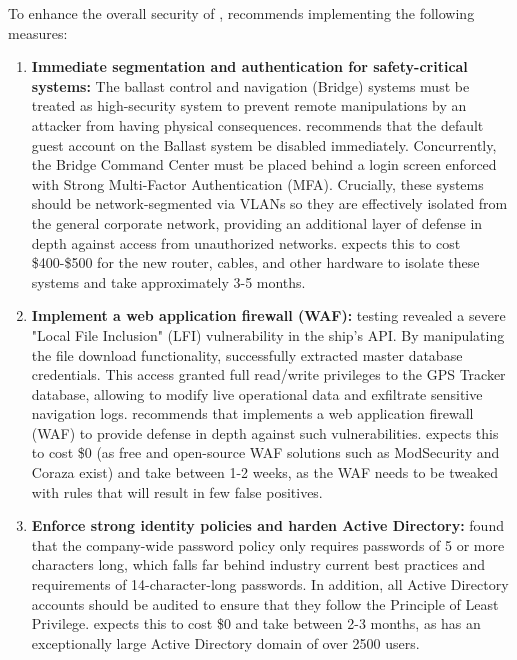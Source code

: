 To enhance the overall security of \clientNoSpace, \team recommends implementing the following measures:

\begin{enumerate}
\item \textbf{Immediate segmentation and authentication for safety-critical systems:} The ballast control and navigation (Bridge) systems must be treated as high-security system to prevent remote manipulations by an attacker from having physical consequences. \team recommends that the default guest account on the Ballast system be disabled immediately. Concurrently, the Bridge Command Center must be placed behind a login screen enforced with Strong Multi-Factor Authentication (MFA). Crucially, these systems should be network-segmented via VLANs so they are effectively isolated from the general corporate network, providing an additional layer of defense in depth against access from unauthorized networks. \team expects this to cost \$400-\$500 for the new router, cables, and other hardware to isolate these systems and take approximately 3-5 months.\item \textbf{Implement a web application firewall (WAF):} \teamP testing revealed a severe "Local File Inclusion" (LFI) vulnerability in the ship's API. By manipulating the file download functionality, \team successfully extracted master database credentials. This access granted full read/write privileges to the GPS Tracker database, allowing \team to modify live operational data and exfiltrate sensitive navigation logs. \teamP recommends that \client implements a web application firewall (WAF) to provide defense in depth against such vulnerabilities. \team expects this to cost \$0 (as free and open-source WAF solutions such as ModSecurity and Coraza exist) and take between 1-2 weeks, as the WAF needs to be tweaked with rules that will result in few false positives.\item \textbf{Enforce strong identity policies and harden Active Directory:} \teamP found that the company-wide password policy only requires passwords of 5 or more characters long, which falls far behind industry current best practices and requirements of 14-character-long passwords. In addition, all Active Directory accounts should be audited to ensure that they follow the Principle of Least Privilege. \team expects this to cost \$0 and take between 2-3 months, as \client has an exceptionally large Active Directory domain of over 2500 users.
\end{enumerate}
